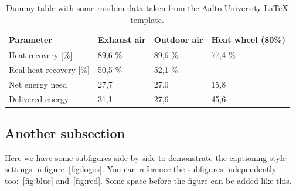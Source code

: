 \documentclass[12pt, a4paper, oneside]{article}
\begin{document}
\begin{table}[t]
    \centering
    \caption[Dummy table]{Dummy table with some random data taken from the Aalto University LaTeX template.}
    \begin{tabularx}{\textwidth}{Xlll}
        \toprule
        \textbf{Parameter}      & \textbf{Exhaust air} & \textbf{Outdoor air} & \textbf{Heat wheel (80\%)} \\
        \midrule
        Heat recovery [\%]      & 89,6 \%              & 89,6 \%              & 77,4 \%                    \\
        Real heat recovery [\%] & 50,5 \%              & 52,1 \%              & -                          \\
        Net energy need         & 27,7                 & 27,0                 & 15,8                       \\
        Delivered energy        & 31,1                 & 27,6                 & 45,6                       \\
        \bottomrule
    \end{tabularx}
    \label{tab:example}
\end{table}

\subsection{Another subsection} \label{subsec:another-subsection}

Here we have some subfigures side by side to demonstrate the captioning style settings in figure~\ref{fig:logos}.
You can reference the subfigures independently too:~\ref{fig:blue} and~\ref{fig:red}.
Some space before the figure can be added like this. \medskip
\end{document}
